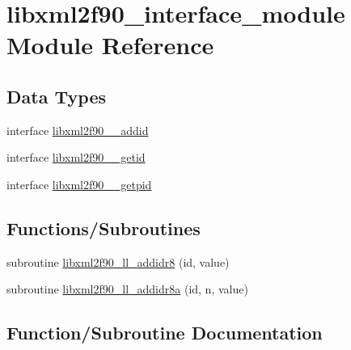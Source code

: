 \hypertarget{namespacelibxml2f90__interface__module}{}\section{libxml2f90\+\_\+interface\+\_\+module Module Reference}
\label{namespacelibxml2f90__interface__module}
\subsection*{Data Types}
\begin{DoxyCompactItemize}
\item 
interface \hyperlink{interfacelibxml2f90__interface__module_1_1libxml2f90____addid}{libxml2f90\+\_\+\+\_\+addid}
\item 
interface \hyperlink{interfacelibxml2f90__interface__module_1_1libxml2f90____getid}{libxml2f90\+\_\+\+\_\+getid}
\item 
interface \hyperlink{interfacelibxml2f90__interface__module_1_1libxml2f90____getpid}{libxml2f90\+\_\+\+\_\+getpid}
\end{DoxyCompactItemize}
\subsection*{Functions/\+Subroutines}
\begin{DoxyCompactItemize}
\item 
subroutine \hyperlink{namespacelibxml2f90__interface__module_a74e6744ce3a60bdf75d94db9e9683fa8}{libxml2f90\+\_\+ll\+\_\+addidr8} (id, value)
\item 
subroutine \hyperlink{namespacelibxml2f90__interface__module_a2532faf7ac758a77d95784b4bf95e13d}{libxml2f90\+\_\+ll\+\_\+addidr8a} (id, n, value)
\end{DoxyCompactItemize}


\subsection{Function/\+Subroutine Documentation}
\mbox{\label{namespacelibxml2f90__interface__module_a74e6744ce3a60bdf75d94db9e9683fa8}} 
